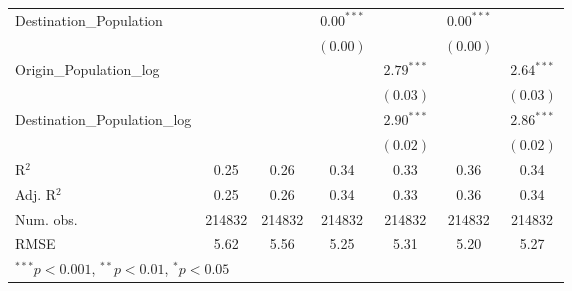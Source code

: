 \begin{table}
\begin{center}
\begin{tabular}{l c c c c c c }
			Destination\_Population      &               &               & $0.00^{***}$  &                & $0.00^{***}$  &                \\
			&               &               & $(0.00)$      &                & $(0.00)$      &                \\
			Origin\_Population\_log      &               &               &               & $2.79^{***}$   &               & $2.64^{***}$   \\
			&               &               &               & $(0.03)$       &               & $(0.03)$       \\
			Destination\_Population\_log &               &               &               & $2.90^{***}$   &               & $2.86^{***}$   \\
			&               &               &               & $(0.02)$       &               & $(0.02)$       \\
			\hline
			R$^2$                        & 0.25          & 0.26          & 0.34          & 0.33           & 0.36          & 0.34           \\
			Adj. R$^2$                   & 0.25          & 0.26          & 0.34          & 0.33           & 0.36          & 0.34           \\
			Num. obs.                    & 214832        & 214832        & 214832        & 214832         & 214832        & 214832         \\
			RMSE                         & 5.62          & 5.56          & 5.25          & 5.31           & 5.20          & 5.27           \\
			\hline
			\multicolumn{7}{l}{\scriptsize{$^{***}p<0.001$, $^{**}p<0.01$, $^*p<0.05$}}
		\end{tabular}
		\label{table:GravityModel2017Q3}
	\end{center}
\end{table}


